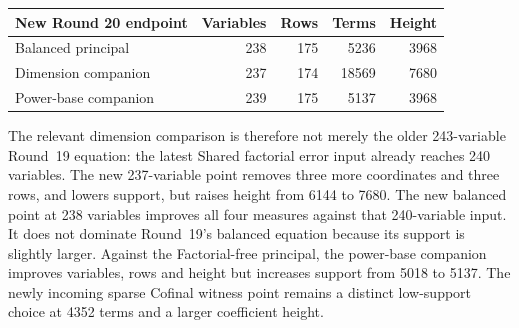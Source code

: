 \begin{center}\small
\begin{tabular}{@{}lrrrr@{}}\toprule
New Round 20 endpoint & Variables & Rows & Terms & Height\\\midrule
Balanced principal &238&175&5236&3968\\
Dimension companion &237&174&18569&7680\\
Power-base companion &239&175&5137&3968\\\bottomrule
\end{tabular}
\end{center}
The relevant dimension comparison is therefore not merely the older
243-variable Round~19 equation: the latest Shared factorial error input
already reaches 240 variables. The new 237-variable point removes three
more coordinates and three rows, and lowers support, but raises height
from 6144 to 7680. The new balanced point at 238 variables improves
all four measures against that 240-variable input. It does not dominate
Round~19's balanced equation because its support is slightly larger.
Against the Factorial-free principal, the power-base companion improves
variables, rows and height but increases support from 5018 to 5137.
The newly incoming sparse Cofinal witness point remains a distinct
low-support choice at 4352 terms and a larger coefficient height.
